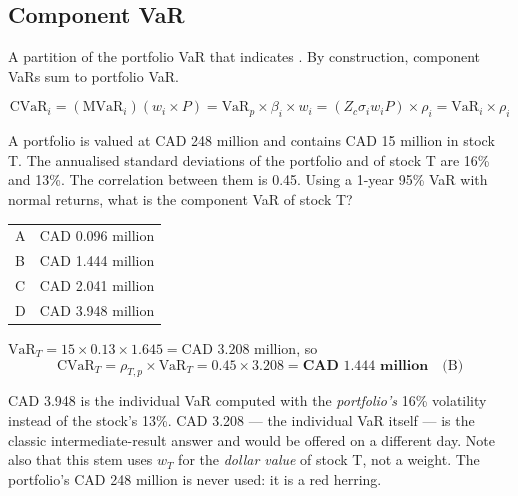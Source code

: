 \subsection{Component VaR}

\begin{imdefbox}[title={Component VaR}]
A partition of the portfolio VaR that indicates . By construction,
component VaRs sum to portfolio VaR.
\end{imdefbox}

\begin{imfmlbox}
\[ \text{CVaR}_i = (\text{MVaR}_i)(w_i \times P) = \text{VaR}_p \times \beta_i \times w_i
   = (Z_c \sigma_i w_i P) \times \rho_i = \text{VaR}_i \times \rho_i \]
\end{imfmlbox}

\begin{imexbox}[title={Component VaR from a correlation}]
A portfolio is valued at CAD 248 million and contains CAD 15 million in stock T.
The annualised standard deviations of the portfolio and of stock T are 16\% and
13\%. The correlation between them is 0.45. Using a 1-year 95\% VaR with normal
returns, what is the component VaR of stock T?

\medskip
\begin{tabular}{@{}ll@{}}
A & CAD 0.096 million \\
B & CAD 1.444 million \\
C & CAD 2.041 million \\
D & CAD 3.948 million \\
\end{tabular}

\medskip
$\text{VaR}_T = 15 \times 0.13 \times 1.645 = \text{CAD } 3.208$ million, so
\[ \text{CVaR}_T = \rho_{T,p} \times \text{VaR}_T = 0.45 \times 3.208
   = \mathbf{\text{CAD } 1.444\text{ million}} \quad\text{(B)} \]
\end{imexbox}

\begin{imtrapbox}[breakable=false,title={Every distractor here is a real quantity}]
CAD 3.948 is the individual VaR computed with the \emph{portfolio's} 16\%
volatility instead of the stock's 13\%. CAD 3.208 --- the individual VaR itself
--- is the classic intermediate-result answer and would be offered on a different
day. Note also that this stem uses $w_T$ for the \emph{dollar value} of stock T,
not a weight. The portfolio's CAD 248 million is never used: it is a red herring.
\end{imtrapbox}

